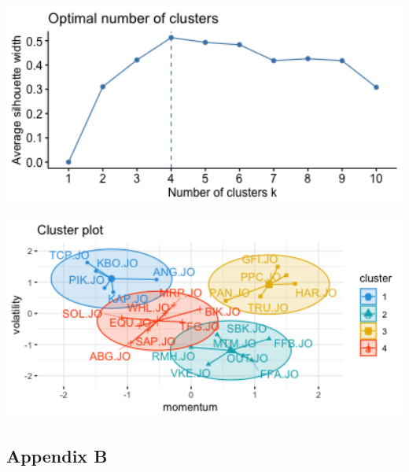 \documentclass[11pt,preprint, authoryear]{elsarticle}
\let\origfigure\figure
\let\endorigfigure\endfigure
\renewenvironment{figure}[1][2] {
    \expandafter\origfigure\expandafter[H]
} {
    \endorigfigure
}
\numberwithin{equation}{section}
\numberwithin{figure}{section}
\numberwithin{table}{section}
\begin{document}
\begin{figure}[H]

\includegraphics[width=5.56in]{images/silhouette} \hfill{}

\caption{ Silhoutte Indexes for Clusters \label{fig1}}\label{fig:unnamed-chunk-2}
\end{figure}

\begin{figure}[H]

\includegraphics[width=5.56in]{images/clusters_image} \hfill{}

\caption{ Clusters Results from Highest Silhoutte \label{fig2}}\label{fig:unnamed-chunk-3}
\end{figure}

\hypertarget{appendix-b}{%
\subsection{Appendix B}\label{appendix-b}}


\end{document}
